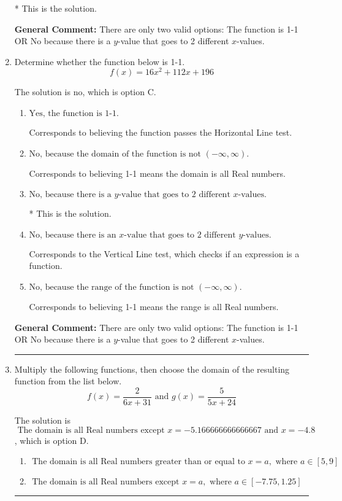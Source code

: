 \documentclass{extbook}[14pt]
\newcommand{\litem}[1]{\item #1

\rule{\textwidth}{0.4pt}}
\begin{document}
\begin{enumerate}
{\begin{enumerate}[label=\Alph*.]
* This is the solution.
\end{enumerate}

\textbf{General Comment:} There are only two valid options: The function is 1-1 OR No because there is a $y$-value that goes to 2 different $x$-values.
}
\litem{
Determine whether the function below is 1-1.
\[ f(x) = 16 x^2 + 112 x + 196 \]

The solution is \( \text{no} \), which is option C.\begin{enumerate}[label=\Alph*.]
\item \( \text{Yes, the function is 1-1.} \)

Corresponds to believing the function passes the Horizontal Line test.
\item \( \text{No, because the domain of the function is not $(-\infty, \infty)$.} \)

Corresponds to believing 1-1 means the domain is all Real numbers.
\item \( \text{No, because there is a $y$-value that goes to 2 different $x$-values.} \)

* This is the solution.
\item \( \text{No, because there is an $x$-value that goes to 2 different $y$-values.} \)

Corresponds to the Vertical Line test, which checks if an expression is a function.
\item \( \text{No, because the range of the function is not $(-\infty, \infty)$.} \)

Corresponds to believing 1-1 means the range is all Real numbers.
\end{enumerate}

\textbf{General Comment:} There are only two valid options: The function is 1-1 OR No because there is a $y$-value that goes to 2 different $x$-values.
}
\litem{
Multiply the following functions, then choose the domain of the resulting function from the list below.
\[ f(x) = \frac{2}{6x+31} \text{ and } g(x) = \frac{5}{5x+24} \]

The solution is \( \text{ The domain is all Real numbers except } x = -5.166666666666667 \text{ and } x = -4.8 \), which is option D.\begin{enumerate}[label=\Alph*.]
\item \( \text{ The domain is all Real numbers greater than or equal to } x = a, \text{ where } a \in [5, 9] \)


\item \( \text{ The domain is all Real numbers except } x = a, \text{ where } a \in [-7.75, 1.25] \)



\end{enumerate}}
\end{enumerate}
\end{document}
